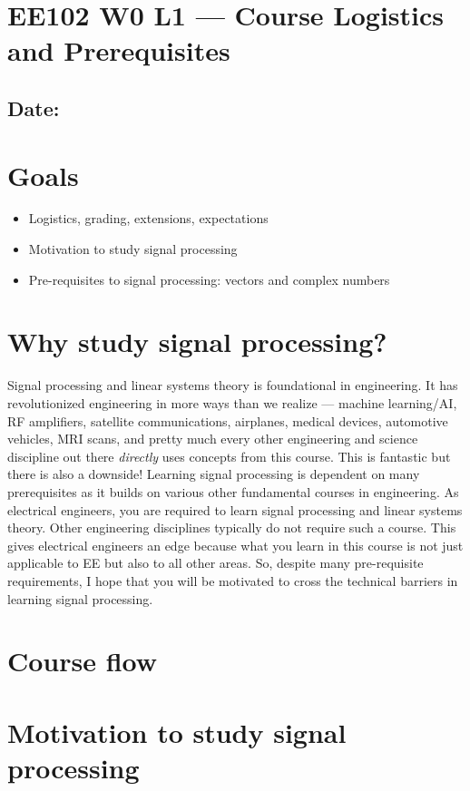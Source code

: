 \section*{EE102 W0 L1 --- Course Logistics and Prerequisites}
\subsection*{Date: \releasedate}
\section{Goals}
\begin{itemize}
  \item Logistics, grading, extensions, expectations
  \item Motivation to study signal processing
  \item Pre-requisites to signal processing: vectors and complex numbers
\end{itemize}

\section{Why study signal processing?}
Signal processing and linear systems theory is foundational in engineering. It has revolutionized engineering in more ways than we realize --- machine learning/AI, RF amplifiers, satellite communications, airplanes, medical devices, automotive vehicles, MRI scans, and pretty much every other engineering and science discipline out there \emph{directly} uses concepts from this course. This is fantastic but there is also a downside! Learning signal processing is dependent on many prerequisites as it builds on various other fundamental courses in engineering. As electrical engineers, you are required to learn signal processing and linear systems theory. Other engineering disciplines typically do not require such a course. This gives electrical engineers an edge because what you learn in this course is not just applicable to EE but also to all other areas. So, despite many pre-requisite requirements, I hope that you will be motivated to cross the technical barriers  in learning signal processing.
\section{Course flow}
\section{Motivation to study signal processing}
